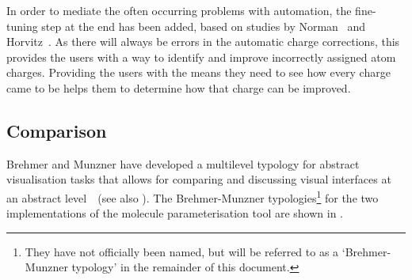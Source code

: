 In order to mediate the often occurring problems with automation, the fine-tuning step at the end has been added, based on studies by Norman~\cite{norman1990problem} and Horvitz~\cite{horvitz1999principles}. As there will always be errors in the automatic charge corrections, this provides the users with a way to identify and improve incorrectly assigned atom charges. Providing the users with the means they need to see how every charge came to be helps them to determine how that charge can be improved.


\subsection{Comparison}
Brehmer and Munzner have developed a multilevel typology for abstract visualisation tasks that allows for comparing and discussing visual interfaces at an abstract level~\cite{brehmer2013multi}~(see also ). The Brehmer-Munzner typologies\footnote{They have not officially been named, but will be referred to as a `Brehmer-Munzner typology' in the remainder of this document.} for the two implementations of the molecule parameterisation tool are shown in .

